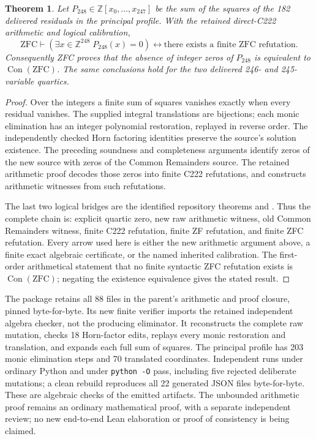 \documentclass[11pt,letterpaper]{article}
\newcommand{\Z}{\mathbb Z}
\newtheorem{theorem}{Theorem}[section]
\theoremstyle{definition}
\theoremstyle{remark}
\begin{document}
\begin{theorem}
\label{thm:direct248}
Let $P_{248}\in\Z[x_0,\ldots,x_{247}]$ be the sum of the squares of
the 182 delivered residuals in the principal profile.  With the
retained direct-C222 arithmetic and logical calibration,
\[
 \mathrm{ZFC}\vdash
 \left(\exists x\in\Z^{248}\;P_{248}(x)=0\right)
 \longleftrightarrow
 \text{there exists a finite ZFC refutation}.
\]
Consequently ZFC proves that the absence of integer zeros of $P_{248}$
is equivalent to $\operatorname{Con}(\mathrm{ZFC})$.
The same conclusions hold for the two delivered 246- and 245-variable
quartics.
\end{theorem}
\begin{proof}
Over the integers a finite sum of squares vanishes exactly when every
residual vanishes.  The supplied integral translations are bijections;
each monic elimination has an integer polynomial restoration, replayed
in reverse order.  The independently checked Horn factoring identities
preserve the source's solution existence.  The preceding soundness and
completeness arguments identify zeros of the new source with zeros of
the Common Remainders source.  The retained arithmetic proof decodes
those zeros into finite C222 refutations, and constructs arithmetic
witnesses from such refutations.

The last two logical bridges are the identified repository theorems
 and
.
Thus the complete chain is: explicit quartic zero, new raw arithmetic
witness, old Common Remainders witness, finite C222 refutation, finite
ZF refutation, and finite ZFC refutation.  Every arrow used here is
either the new arithmetic argument above, a finite exact algebraic
certificate, or the named inherited calibration.  The first-order
arithmetical statement that no finite syntactic ZFC refutation exists
is $\operatorname{Con}(\mathrm{ZFC})$; negating the existence
equivalence gives the stated result.
\end{proof}

The package retains all 88 files in the parent's arithmetic and proof
closure, pinned byte-for-byte.  Its new finite verifier imports the
retained independent algebra checker, not the producing eliminator.  It
reconstructs the complete raw mutation, checks 18 Horn-factor edits,
replays every monic restoration and translation, and expands each full
sum of squares.  The principal profile has 203 monic elimination steps
and 70 translated coordinates.  Independent runs under ordinary Python
and under \texttt{python -O} pass, including five rejected deliberate
mutations; a clean rebuild reproduces all 22 generated JSON files
byte-for-byte.  These are algebraic checks of the emitted artifacts.
The unbounded arithmetic proof remains an ordinary mathematical proof,
with a separate independent review; no new end-to-end Lean elaboration
or proof of consistency is being claimed.
\end{document}
